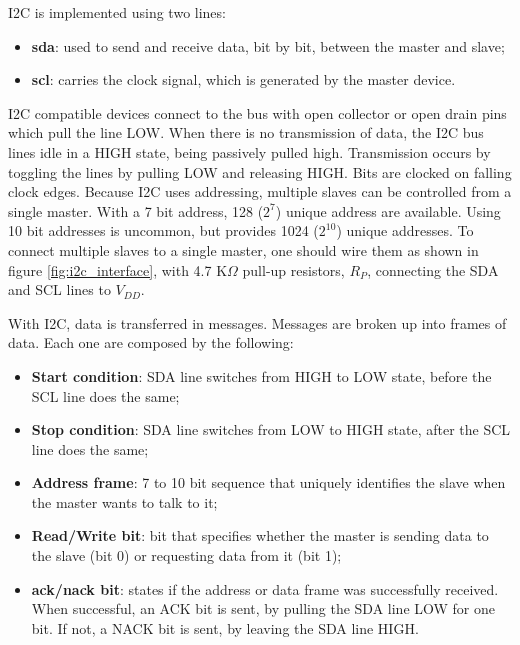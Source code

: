 I2C is implemented using two lines:
\begin{itemize}
	\item \textbf{\ac{sda}}: used to send and receive data, bit by bit, between the master and slave;
	\item \textbf{\ac{scl}}: carries the clock signal, which is generated by the master device.
\end{itemize}

I2C compatible devices connect to the bus with open collector or open drain pins which pull the line LOW. When there is no transmission of data, the I2C bus lines idle in a HIGH state, being passively pulled high. Transmission occurs by toggling the lines by pulling LOW and releasing HIGH. Bits are clocked on falling clock edges. Because I2C uses addressing, multiple slaves can be controlled from a single master. With a 7 bit address, 128 ($2^7$) unique address are available. Using 10 bit addresses is uncommon, but provides 1024 ($2^{10}$) unique addresses. To connect multiple slaves to a single master, one should wire them as shown in figure \ref{fig:i2c_interface}, with 4.7 K$\Omega$ pull-up resistors, $R_{P}$, connecting the SDA and SCL lines to $V_{DD}$. \cite{i2c_basics}

\clearpage
With I2C, data is transferred in messages. Messages are broken up into frames of data. Each one are composed by the following:
\begin{itemize}
	\item \textbf{Start condition}: SDA line switches from HIGH to LOW state, before the SCL line does the same;
	\item \textbf{Stop condition}: SDA line switches from LOW to HIGH state, after the SCL line does the same;
	\item \textbf{Address frame}: 7 to 10 bit sequence that uniquely identifies the slave when the master wants to talk to it;
	\item \textbf{Read/Write bit}: bit that specifies whether the master is sending data to the slave (bit 0) or requesting data from it (bit 1);
	\item \textbf{\ac{ack}/\ac{nack} bit}: states if the address or data frame was successfully received. When successful, an ACK bit is sent, by pulling the SDA line LOW for one bit. If not, a NACK bit is sent, by leaving the SDA line HIGH.
\end{itemize}


